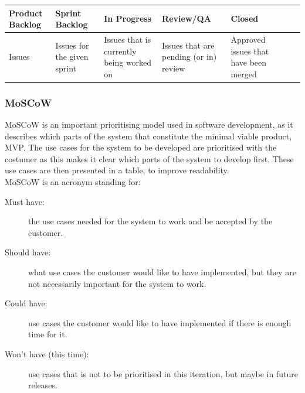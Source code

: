 \begin{table}[H]
    \begin{tabularx}{\textwidth}{|>{\RaggedRight}X|>{\RaggedRight}X|>{\RaggedRight}X|>{\RaggedRight}X|>{\RaggedRight}X|>{\RaggedRight}X|>{\RaggedRight}X|}
        \hline                             
        \textbf{Product Backlog} & \textbf{Sprint Backlog} & \textbf{In Progress} & \textbf{Review/QA} & \textbf{Closed} \\
        \hline
        Issues & Issues for the given sprint & Issues that is currently being worked on & Issues that are pending (or in) review & Approved issues that have been merged    \\
        \hline
    \end{tabularx}
    \label{table:scrum}
\end{table} 

\subsubsection{MoSCoW}
MoSCoW is an important prioritising model used in software development, as it
describes which parts of the system that constitute the minimal viable product,
MVP. The use cases for the system to be developed are prioritised with the
costumer as this makes it clear which parts of the system to develop first. \cite{moscow}
These use cases are then presented in a table, to improve readability.\\

MoSCoW is an acronym standing for:\\

\begin{description}
    \item [Must have:] the use cases needed for the system to work and be
    accepted by the customer.

    \item [Should have:] what use cases the customer would like to have
    implemented, but they are not necessarily important for the system to work.

    \item [Could have:] use cases the customer would like to have implemented if
    there is enough time for it.

    \item [Won't have (this time):] use cases that is not to be prioritised in
    this iteration, but maybe in future releases.
\end{description}

